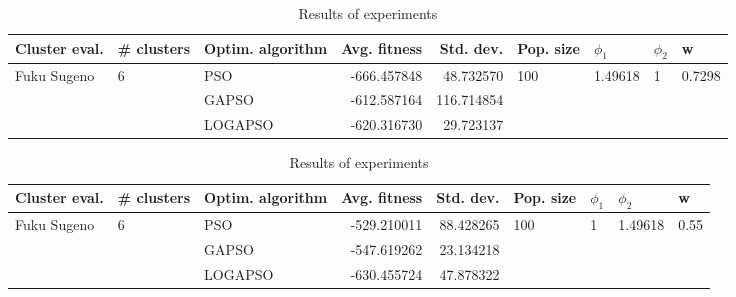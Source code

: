 \documentclass{article}
\begin{document}
\begin{table}
\centering
\caption{Results of experiments}
\begin{tabular}{lllrrllll}
\toprule
               Cluster eval. &        \# clusters & Optim. algorithm &  Avg. fitness &  Std. dev. &            Pop. size &               $\phi_{1}$ &         $\phi_{2}$ &                       w \\
\midrule
\multirow{3}{*}{Fuku Sugeno} & \multirow{3}{*}{6} &              PSO &   -666.457848 &  48.732570 & \multirow{3}{*}{100} & \multirow{3}{*}{1.49618} & \multirow{3}{*}{1} & \multirow{3}{*}{0.7298} \\
                             &                    &            GAPSO &   -612.587164 & 116.714854 &                      &                          &                    &                         \\
                             &                    &          LOGAPSO &   -620.316730 &  29.723137 &                      &                          &                    &                         \\
\bottomrule
\end{tabular}
\end{table}
\begin{table}
\centering
\caption{Results of experiments}
\begin{tabular}{lllrrllll}
\toprule
               Cluster eval. &        \# clusters & Optim. algorithm &  Avg. fitness &  Std. dev. &            Pop. size &         $\phi_{1}$ &               $\phi_{2}$ &                     w \\
\midrule
\multirow{3}{*}{Fuku Sugeno} & \multirow{3}{*}{6} &              PSO &   -529.210011 &  88.428265 & \multirow{3}{*}{100} & \multirow{3}{*}{1} & \multirow{3}{*}{1.49618} & \multirow{3}{*}{0.55} \\
                             &                    &            GAPSO &   -547.619262 &  23.134218 &                      &                    &                          &                       \\
                             &                    &          LOGAPSO &   -630.455724 &  47.878322 &                      &                    &                          &                       \\
\bottomrule
\end{tabular}
\end{table}
\end{document}
